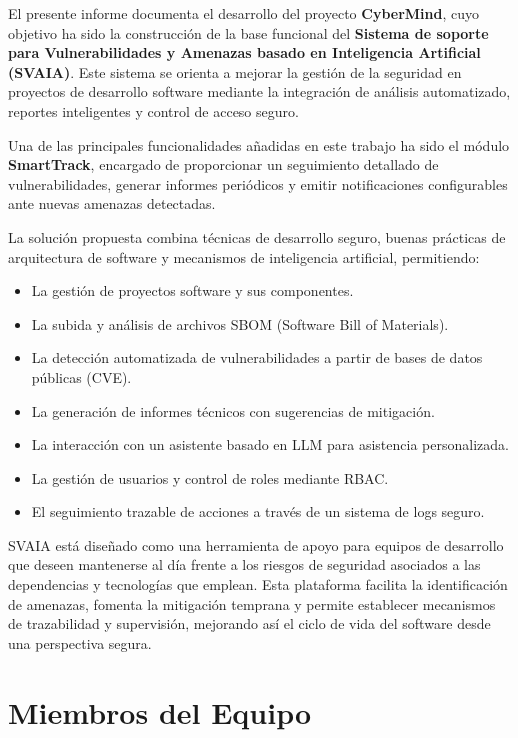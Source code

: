 \documentclass[11pt]{article}
\begin{document}
El presente informe documenta el desarrollo del proyecto \textbf{CyberMind}, cuyo objetivo ha sido la construcción de la base funcional del \textbf{Sistema de soporte para Vulnerabilidades y Amenazas basado en Inteligencia Artificial (SVAIA)}. Este sistema se orienta a mejorar la gestión de la seguridad en proyectos de desarrollo software mediante la integración de análisis automatizado, reportes inteligentes y control de acceso seguro.

Una de las principales funcionalidades añadidas en este trabajo ha sido el módulo \textbf{SmartTrack}, encargado de proporcionar un seguimiento detallado de vulnerabilidades, generar informes periódicos y emitir notificaciones configurables ante nuevas amenazas detectadas.

La solución propuesta combina técnicas de desarrollo seguro, buenas prácticas de arquitectura de software y mecanismos de inteligencia artificial, permitiendo:

\begin{itemize}
    \item La gestión de proyectos software y sus componentes.
    \item La subida y análisis de archivos SBOM (Software Bill of Materials).
    \item La detección automatizada de vulnerabilidades a partir de bases de datos públicas (CVE).
    \item La generación de informes técnicos con sugerencias de mitigación.
    \item La interacción con un asistente basado en LLM para asistencia personalizada.
    \item La gestión de usuarios y control de roles mediante RBAC.
    \item El seguimiento trazable de acciones a través de un sistema de logs seguro.
\end{itemize}

SVAIA está diseñado como una herramienta de apoyo para equipos de desarrollo que deseen mantenerse al día frente a los riesgos de seguridad asociados a las dependencias y tecnologías que emplean. Esta plataforma facilita la identificación de amenazas, fomenta la mitigación temprana y permite establecer mecanismos de trazabilidad y supervisión, mejorando así el ciclo de vida del software desde una perspectiva segura.

\section{Miembros del Equipo}
\end{document}
